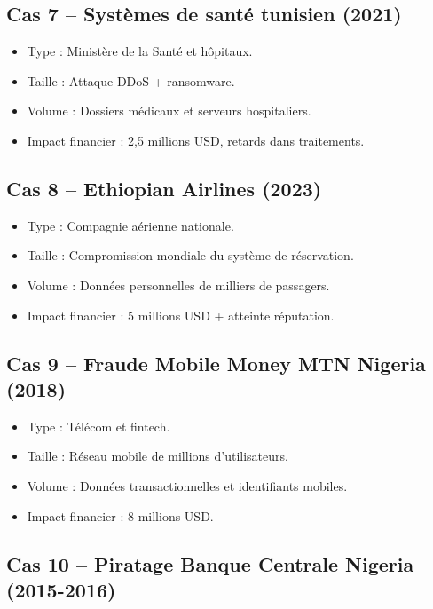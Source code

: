 \documentclass[12pt]{article}
\begin{document}
\begin{center}
\subsection{Cas 7 – Systèmes de santé tunisien (2021)}
\begin{itemize}[leftmargin=*, label=\textbullet]
    \item Type : Ministère de la Santé et hôpitaux.
    \item Taille : Attaque DDoS + ransomware.
    \item Volume : Dossiers médicaux et serveurs hospitaliers.
    \item Impact financier : 2,5 millions USD, retards dans traitements.
\end{itemize}

\subsection{Cas 8 – Ethiopian Airlines (2023)}
\begin{itemize}[leftmargin=*, label=\textbullet]
    \item Type : Compagnie aérienne nationale.
    \item Taille : Compromission mondiale du système de réservation.
    \item Volume : Données personnelles de milliers de passagers.
    \item Impact financier : 5 millions USD + atteinte réputation.
\end{itemize}

\subsection{Cas 9 – Fraude Mobile Money MTN Nigeria (2018)}
\begin{itemize}[leftmargin=*, label=\textbullet]
    \item Type : Télécom et fintech.
    \item Taille : Réseau mobile de millions d’utilisateurs.
    \item Volume : Données transactionnelles et identifiants mobiles.
    \item Impact financier : 8 millions USD.
\end{itemize}

\subsection{Cas 10 – Piratage Banque Centrale Nigeria (2015-2016)}


\end{center}
\end{document}
